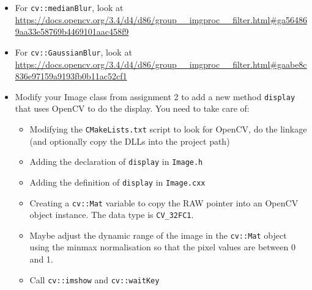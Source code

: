 \documentclass[english,a4paper,12pt,oneside]{article}
\begin{document}
\begin{itemize}
	\item For \verb|cv::medianBlur|, look at \url{https://docs.opencv.org/3.4/d4/d86/group__imgproc__filter.html#ga564869aa33e58769b4469101aac458f9} 
	\item For \verb|cv::GaussianBlur|, look at \url{https://docs.opencv.org/3.4/d4/d86/group__imgproc__filter.html#gaabe8c836e97159a9193fb0b11ac52cf1}
	\item Modify your Image class from assignment 2 to add a new method \verb+display+ that uses OpenCV to do the display. You need to take care of:
\begin{itemize}
		\item Modifying the \verb+CMakeLists.txt+ script to look for OpenCV, do the linkage (and optionally copy the DLLs into the project path)
		\item Adding the declaration of \verb+display+ in \verb+Image.h+
		\item Adding the definition of \verb+display+ in \verb+Image.cxx+
		\item Creating a  \verb+cv::Mat+ variable to copy the RAW pointer into an OpenCV object instance. The data type is \verb+CV_32FC1+.
		\item Maybe adjust the dynamic range of the image in the \verb+cv::Mat+ object using the minmax normalisation so that the pixel values are between 0 and 1.
	\item Call \verb+cv::imshow+ and \verb+cv::waitKey+
\end{itemize}
\end{itemize}


\end{document}
